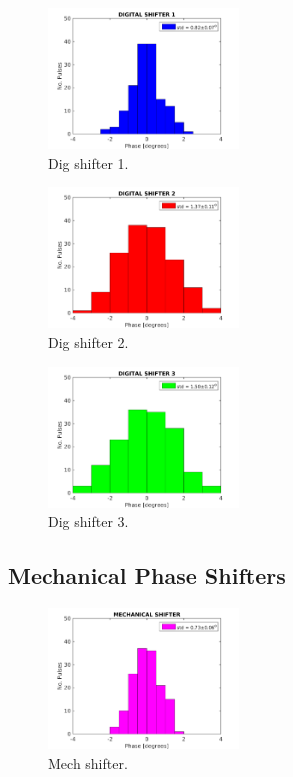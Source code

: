 \begin{figure}
  \centering
  \includegraphics[width=0.45\textwidth]{Figures/PhMon_HistDig1}
  \caption{Dig shifter 1.}
  \label{f:PhMon_HistDig1}
\end{figure}

\begin{figure}
  \centering
  \includegraphics[width=0.45\textwidth]{Figures/PhMon_HistDig2}
  \caption{Dig shifter 2.}
  \label{f:PhMon_HistDig2}
\end{figure}

\begin{figure}
  \centering
  \includegraphics[width=0.45\textwidth]{Figures/PhMon_HistDig3}
  \caption{Dig shifter 3.}
  \label{f:PhMon_HistDig3}
\end{figure}

\subsection{Mechanical Phase Shifters}
\label{ss:mechShiftNoise}

\begin{figure}
  \centering
  \includegraphics[width=0.45\textwidth]{Figures/PhMon_HistMech}
  \caption{Mech shifter.}
  \label{f:PhMon_HistMech}
\end{figure}

